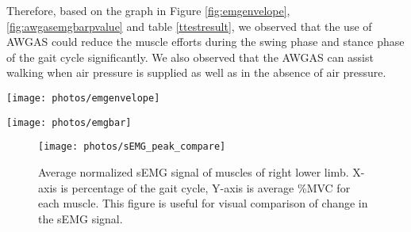 \documentclass[paper,JRM,paper]{jaciiiarticle}
\begin{document}
Therefore, based on the graph in Figure \ref{fig:emgenvelope}, \ref{fig:awgasemgbarpvalue} and table \ref{ttestresult}, we observed that the use of AWGAS could reduce the muscle efforts during the swing phase and stance phase of the gait cycle significantly. We also observed that the AWGAS can assist walking when air pressure is supplied as well as in the absence of air pressure. 



\begin{figure*}
	\centering
	\texttt{[image: photos/emgenvelope]}
	\caption{Changes in the msuclemuscle activation pattern of the gait cycle due to the use of AWGAS with standard deviation. The X-axis signifies the gait cycle from 0 to 100 \% and the Y-axis signifies the average \%MVC sEMG activation pattern for each muscle under observation}
	\label{fig:emgenvelope}
\end{figure*}
\begin{figure*}
	\centering
	\texttt{[image: photos/emgbar]}
	\caption{Statistical evaluation of AWGAS based on the average of \% MVC for all subjectparticipants. X-axis is for all the muscles under observation and Y-axis is the average \% MVC for all subjectparticipants}
	\label{fig:awgasemgbarpvalue}
\end{figure*}
\begin{figure}
	\centering
	\texttt{[image: photos/sEMG\_peak\_compare]}
	\caption{Average normalized sEMG signal of muscles of right lower limb. X-axis is percentage of the gait cycle, Y-axis is average \%MVC for each muscle. This figure is useful for visual comparison of change in the sEMG signal.}
	\label{fig:semgpeakcompare}
\end{figure}
\end{document}
